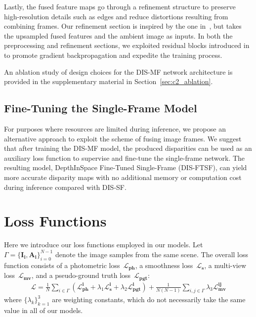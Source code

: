 Lastly, the fused feature maps go through a refinement structure to preserve high-resolution details such as edges and reduce distortions resulting from combining frames. Our refinement section is inspired by the one in~\cite{zhang2018activestereonet}, but takes the upsampled fused features and the ambient image as inputs. In both the preprocessing and refinement sections, we exploited residual blocks introduced in~\cite{he2016deep} to promote gradient backpropagation and expedite the training process.

An ablation study of design choices for the DIS-MF network architecture is provided in the supplementary material in Section~\ref{sec:c2_ablation}.

\subsection{Fine-Tuning the Single-Frame Model} \label{sec:c2_fine-tuned}

For purposes where resources are limited during inference, we propose an alternative approach to exploit the scheme of fusing image frames. We suggest that after training the DIS-MF model, the produced disparities can be used as an auxiliary loss function to supervise and fine-tune the single-frame network. The resulting model, DepthInSpace Fine-Tuned Single-Frame (DIS-FTSF), can yield more accurate disparity maps with no additional memory or computation cost during inference compared with DIS-SF.

\section{Loss Functions}\label{sec:c2_loss}

Here we introduce our loss functions employed in our models. Let $\Gamma=\{\boldsymbol{I_{i}}, \boldsymbol{A_{i}}\}_{i=0}^{N-1}$ denote the image samples from the same scene. The overall loss function consists of a photometric loss~$\boldsymbol{\mathcal{L}_{ph}}$, a smoothness loss~$\boldsymbol{\mathcal{L}_s}$, a multi-view loss~$\boldsymbol{\mathcal{L}_{mv}}$, and a pseudo-ground truth loss~$\boldsymbol{\mathcal{L}_{pgt}}$:
\begin{align}
    \boldsymbol{\mathcal{L}} = \frac{1}{N}\sum_{i \in \Gamma} (\boldsymbol{\mathcal{L}^{i}_{ph}} + \lambda_{1}\boldsymbol{\mathcal{L}^{i}_{s}} + \lambda_{2}\boldsymbol{\mathcal{L}^{i}_{pgt}}) + \frac{1}{N(N-1)}\sum_{i,j \in \Gamma} \lambda_{3}\boldsymbol{\mathcal{L}^{ij}_{mv}}
\end{align}
where $\{\lambda_{k}\}_{k=1}^{3}$ are weighting constants, which do not necessarily take the same value in all of our models.

